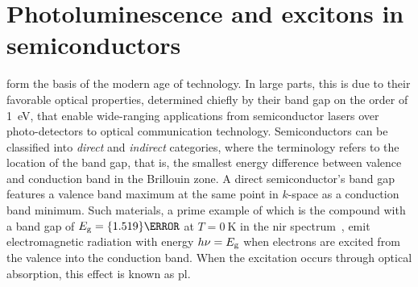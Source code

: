 \chapter{Photoluminescence and excitons in semiconductors}\label{ch:exp:theory}
 form the basis of the modern age of technology.
In large parts, this is due to their favorable optical properties, determined chiefly by their band gap on the order of \qty{1}{\electronvolt}, that enable wide-ranging applications from semiconductor lasers over photo-detectors to optical communication technology.
Semiconductors can be classified into \emph{direct} and \emph{indirect} categories, where the terminology refers to the location of the band gap, that is, the smallest energy difference between valence and conduction band in the Brillouin zone.
A direct semiconductor's band gap features a valence band maximum at the same point in $k$-space as a conduction band minimum.
Such materials, a prime example of which is the compound  with a band gap of $E_{\mr{g}}=\qty{1.519}{\electronvolt}$ at $T=\qty{0}{\kelvin}$ in the \gls{nir} spectrum~\cite{Vurgaftman2001}, emit electromagnetic radiation with energy $h\nu = E_{\mathrm{g}}$ when electrons are excited from the valence into the conduction band.
When the excitation occurs through optical absorption, this effect is known as \gls{pl}.

